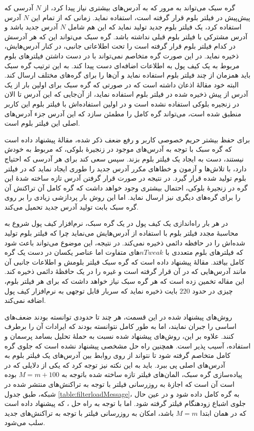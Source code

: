 	گره سبک می‌تواند به مرور که به آدرس‌های بیشتری نیاز پیدا کرد، از $N$ آدرسی که پیش‌پیش در فیلتر بلوم قرار گرفته است، استفاده نماید. زمانی که از تمام این $N$ آدرس استفاده کرد، یک فیلتر بلوم جدید تولید نماید که این هم شامل $N$ آدرس جدید باشد و آدرس مشترکی با فیلتر بلوم قبلی نداشته باشد. گره سبک می‌تواند این که هر آدرسش در کدام فیلتر بلوم قرار گرفته‌ است را تحت اطلاعاتی جانبی، در کنار آدرس‌هایش، ذخیره نماید. در این صورت گره متخاصم نمی‌تواند با در دست داشتن فیلتر‌های بلوم مربوط به یک کیف پول به اطلاعات اضافه‌ای دست پیدا کند. به این ترتیب گره سبک باید همزمان از چند فیلتر بلوم استفاده نماید و آن‌ها را برای گره‌های مختلف ارسال کند. البته خود مقالهٔ \cite{Gervais2014} اذعان داشته است که در صورتی که گره سبک برای اولین بار از یک آدرس از پیش ذخیره شده در فیلتر بلوم استفاده نماید، از آن‌جایی که این آدرس تا الان در زنجیره بلوکی استفاده نشده است و در اولین استفاده‌اش با فیلتر بلوم این کاربر منطبق شده است، می‌تواند گره کامل را مطمئن سازد که این آدرس جزء آدرس‌های اصلی این فیلتر بلوم است.
	
	برای حفظ بیشتر حریم خصوصی کاربر و رفع ضعف ذکر شده، مقالهٔ \cite{Gervais2014} پیشنهاد داده است که گره سبک با توجه به آدرس‌های موجود در زنجیرهٔ بلوکی، که مربوط به خودش نیستند، دست به ایجاد یک فیلتر بلوم بزند. سپس سعی کند برای هر آدرسی که احتیاج دارد، با تلاش‌ها و آزمون‌ و خطا‌های مکرر آدرس جدید را طوری ایجاد نماید که در فیلتر بلوم تولید شده قرار گیرد. در نتیجه در صورت قرار گرفتن آدرس تازه ساخته شدهٔ این گره در زنجیرهٔ بلوکی، احتمال بیشتری وجود خواهد داشت که گره کامل آن تراکنش آن را برای گره‌های دیگری نیز ارسال نماید. اما این روش بار پردازشی زیادی را بر روی گره سبک بابت تولید آدرس جدید تحمیل می‌کند.  
	
در هر بار راه‌اندازی یک کیف پول در یک گره سبک، نرم‌افزار کیف پول شروع به محاسبهٔ مجدد فیلتر بلوم با استفاده از آدرس‌هایش می‌نماید چرا که فیلتر بلوم تولید شده‌اش را در حافظه دائمی ذخیره نمی‌کند. در نتیجه، این موضوع می‌تواند باعث شود که فیلتر‌های بلوم متعددی با $nTweak$های متفاوت اما عناصر یکسان در دست یک گره کامل بیافتد. مقالهٔ \cite{Gervais2014} پیشنهاد داده است که گره سبک فیلتر بلومش و اطلاعات جانبی آن مانند آدرس‌هایی که در آن قرار گرفته است و غیره را در یک حافظهٔ دائمی ذخیره کند. این مقاله تخمین زده است که هر گره سبک نیاز خواهد داشت که برای هر فیلتر بلوم، چیزی در حدود $220$ بایت ذخیره نماید که سربار قابل توجهی به نرم‌افزار کیف پول اضافه نمی‌کند.
	
	روش‌های پیشنهاد شده در این قسمت، هر چند تا حدودی توانسته بودند ضعف‌های اساسی \cite{Hearn2013} را جبران نمایند، اما به طور کامل نتوانسته بودند که ایرادات آن را برطرف کنند.  علاوه بر این، روش‌های پیشنهاد شده نسبت به حملهٔ تحلیل بسامد پرسمان و استفاده، آسیب پذیر است. همچنین راه حل مشخصی  پیشنهاد نشده است که جلوی گره کامل متخاصم گرفته شود تا نتواند از روی روابط بین آدرس‌های یک فیلتر بلوم به آدرس‌های اصلی پی ببرد. باید به این نکته نیز توجه کرد که یکی از دلایلی که در پیاده‌سازی گره سبک، المان‌های فیلتر تازه ساخته شده باتوجه به $M=m+100$ بوده است آن است که اجازهٔ به روزرسانی فیلتر با توجه به تراکنش‌های منتشر شده در شبکه، طبق جدول \ref{table:filterloadMessage}، به گره کامل داده شود و در عین حال جلوی اشباع زودهنگام فیلتر گرفته شود. اما با توجه به راه حل \cite{Gervais2014}، که پیشنهاد داده است که در همان ابتدا $M=m$ باشد، امکان به روزرسانی فیلتر با توجه به تراکنش‌های جدید سلب می‌شود.


